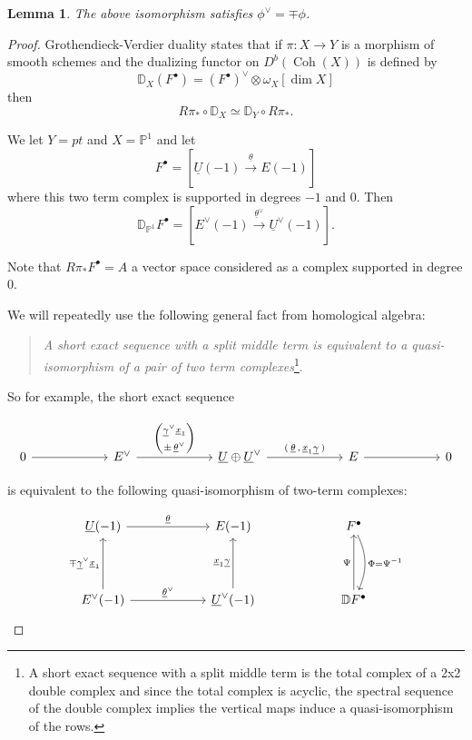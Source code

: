 \message{ !name(Bryan-Vakil.tex)}\documentclass{amsart}
\newtheorem{lemma}[theorem]{Lemma}
\theoremstyle{definition}
\newcommand{\DD} {{\mathbb D}}
\newcommand{\PP}{\mathbb{P}}
\newcommand{\UL}[1]{\underline{#1}}
\newcommand{\homotopyeq}{\simeq}
\newcommand{\Rpistar}{R\pi_{*}}
\begin{document}
\begin{lemma}\label{lem: phivee = mp phi}
The above isomorphism satisfies $\phi^{\vee} = \mp \phi$. 
\end{lemma}
\begin{proof}
Grothendieck-Verdier duality \cite[Eq~3.20]{Huybrechts-FMbook} states
that if $\pi :X\to Y$ is a morphism of smooth schemes and the
dualizing functor on $D^{b}(\operatorname{Coh}(X))$ is defined by 
\[
\DD_{X}(F^{\bullet}) = (F^{\bullet})^{\vee} \otimes \omega_{X}[\dim X ]
\]
then
\[
\Rpistar \circ \DD_{X} \homotopyeq  \DD_{Y}\circ \Rpistar .
\]

We let $Y=pt$ and $X=\PP^{1}$ and let 
\[
F^{\bullet} = [\UL{U}(-1)\stackrel{\UL{\theta}}{\longrightarrow } E(-1)]
\]
where this two term complex is supported in degrees $-1$ and $0$. Then
\[
\DD_{\PP^{1}}F^{\bullet} = [E^{\vee}(-1)\stackrel{\UL{\theta}^{\vee
}}{\longrightarrow } \UL{U}^{\vee}(-1)] .
\]

Note that $\Rpistar F^{\bullet}=A$ a vector space considered as a
complex supported in degree 0.

We will repeatedly use the following general fact from homological
algebra:
\bigskip

\begin{quote}
\emph{A short exact sequence with a split middle term is equivalent to
a quasi-isomorphism of a pair of two term complexes}\footnote{A short
exact sequence with a split middle term is the total complex of a 2x2
double complex and since the total complex is acyclic, the spectral
sequence of the double complex implies the vertical maps induce a
quasi-isomorphism of the rows.}.
\end{quote}
\bigskip

So for example, the short exact sequence

\[
\begin{tikzcd}[column sep=6em]
0 \arrow[r]
& E^{\vee}
  \arrow[r,"{%
    \begin{pmatrix}
      \UL{\gamma}^{\vee}\UL{x}_{1} \\[2pt]
      \pm\,\UL{\theta}^{\vee}
    \end{pmatrix}
  }"]
& \UL{U}\oplus \UL{U}^{\vee}
  \arrow[r,"{(\:\UL{\theta}\,,\,\UL{x}_{1}\UL{\gamma}\:)}"]
& E \arrow[r]
& 0
\end{tikzcd}
\]

is equivalent to the following quasi-isomorphism of two-term complexes:


\[
\begin{tikzcd}[column sep=6em,row sep=4em]
  \UL{U}(-1)
    \arrow[r,"\UL{\theta }"]
  & E(-1)
  & F^{\bullet}
    \arrow[d,bend left=25,"\Phi=\Psi^{-1}   "]\\
  E^{\vee}(-1)
    \arrow[u,"\mp \UL{\gamma}^{\vee}\UL{x}_{1}"]
    \arrow[r,"\UL{\theta }^{\vee}"]
  & \UL{U}^{\vee }(-1)
    \arrow[u,"\UL{x}_{1}\UL{\gamma }"]
  & \DD F^{\bullet}
    \arrow[u,"\Psi  "]
\end{tikzcd}
\]


\end{proof}
\end{document}
